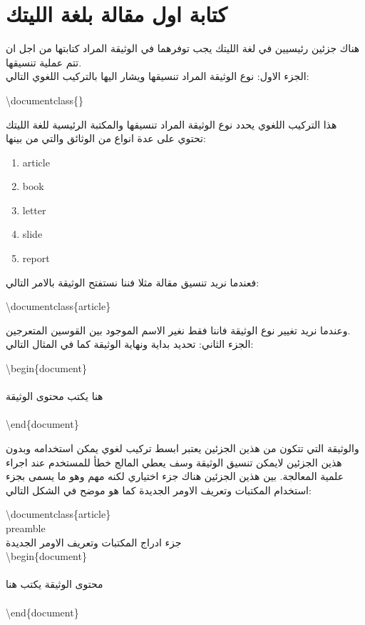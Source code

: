 \section{كتابة اول مقالة بلغة الليتك}
هناك جزئين رئيسيين في لغة الليتك يجب توفرهما في الوثيقة المراد كتابتها من اجل ان تتم عملية تنسيقها. 
\\
الجزء الاول: نوع الوثيقة المراد تنسيقها ويشار اليها بالتركيب اللغوي التالي:
\\
\begin{english}
\begin{mybox}
\textbackslash documentclass\{\}
\end{mybox}
\end{english}
هذا التركيب اللغوي يحدد نوع الوثيقة المراد تنسيقها والمكتبة الرئيسية للغة الليتك تحتوي على عدة انواع من الوثائق والتي من بينها:
\begin{enumerate}
\item{article}
\item{book}
\item{letter}
\item{slide}
\item{report}
\end{enumerate}
فعندما نريد تنسيق مقالة مثلا فننا نستفتح الوثيقة بالامر التالي:
\begin{english}
\begin{mybox}
\textbackslash documentclass\{article\}
\end{mybox}
\end{english}
وعندما نريد تغيير نوع الوثيقة فاننا فقط نغير الاسم الموجود بين القوسين المتعرجين.
\\
الجزء الثاني: تحديد بداية ونهاية الوثيقة كما في المثال التالي:
\begin{english}
\begin{mybox}
\textbackslash begin\{document\}
\\
\\
\textarabic{
هنا يكتب محتوى الوثيقة
}
\\
\\
\textbackslash end\{document\}
\end{mybox}
\end{english}
والوثيقة التي تتكون من هذين الجزئين يعتبر ابسط تركيب لغوي يمكن استخدامه وبدون هذين الجزئين لايمكن تنسيق الوثيقة وسف يعطي المالج خطأ للمستخدم عند اجراء علمية المعالجة.
بين هذين الجزئين هناك جزء اختياري لكنه مهم وهو ما يسمى بجزء استخدام المكتبات وتعريف الاومر الجديدة كما هو موضح في الشكل التالي:
\begin{english}
\begin{mybox}
\textbackslash documentclass\{article\}
\\preamble
\\
\textarabic{
جزء ادراج المكتبات وتعريف الاومر الجديدة
}
\\
\textbackslash begin\{document\}
\\
\\
\textarabic{
محتوى الوثيقة يكتب هنا
}
\\
\\
\textbackslash end\{document\}
\end{mybox}
\end{english}
